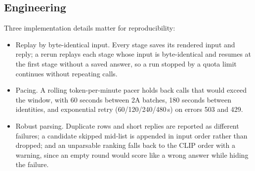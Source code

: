 \subsection{Engineering}
\label{sec:r-engineering}
Three implementation details matter for reproducibility:

\begin{itemize}
\item Replay by byte-identical input. Every stage saves its rendered input and
      reply; a rerun replays each stage whose input is byte-identical and resumes
      at the first stage without a saved answer, so a run stopped by a quota limit
      continues without repeating calls.
\item Pacing. A rolling token-per-minute pacer holds back calls that would exceed
      the window, with 60 seconds between 2A batches, 180 seconds between
      identities, and exponential retry (60/120/240/480\,s) on errors 503 and 429.
\item Robust parsing. Duplicate rows and short replies are reported as different
      failures; a candidate skipped mid-list is appended in input order rather than
      dropped; and an unparsable ranking falls back to the CLIP order with a
      warning, since an empty round would score like a wrong answer while hiding
      the failure.
\end{itemize}

